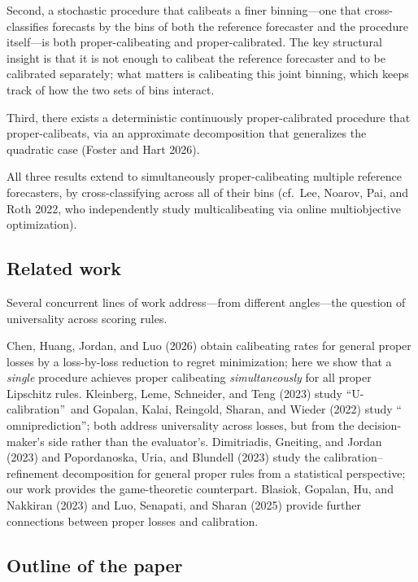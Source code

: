 \documentclass[12pt,a4paper,notitlepage]{article}
\begin{document}
Second, a stochastic procedure that calibeats a finer binning---one
that cross-classifies forecasts by the bins of both the reference
forecaster and the procedure itself---is both proper-calibeating and
proper-calibrated. The key structural insight is that it is not enough
to calibeat the reference forecaster and to be calibrated separately;
what matters is calibeating this joint binning, which keeps track of
how the two sets of bins interact.

Third, there exists a deterministic continuously proper-calibrated procedure
that proper-calibeats, via an approximate decomposition that generalizes the
quadratic case (Foster and Hart 2026).

All three results extend to simultaneously proper-calibeating multiple
reference forecasters, by cross-classifying across all of their bins
(cf.\ Lee, Noarov, Pai, and Roth 2022, who independently study
multicalibeating via online multiobjective optimization).

\subsection{Related work\label{s-s:intro-related}}

Several concurrent lines of work address---from different angles---the
question of universality across scoring rules.

Chen, Huang, Jordan, and Luo (2026) obtain calibeating rates for
general proper losses by a loss-by-loss reduction to regret minimization;
here we show that a \emph{single} procedure achieves proper calibeating
\emph{simultaneously} for all proper Lipschitz rules.
Kleinberg, Leme, Schneider, and Teng (2023) study
\textquotedblleft U-calibration\textquotedblright\ and Gopalan, Kalai,
Reingold, Sharan, and Wieder (2022) study \textquotedblleft
omniprediction\textquotedblright ; both address universality across losses,
but from the decision-maker's side rather than the evaluator's.
Dimitriadis, Gneiting, and Jordan (2023) and Popordanoska, Uria, and
Blundell (2023) study the calibration--refinement decomposition for general
proper rules from a statistical perspective; our work provides the
game-theoretic counterpart.
Blasiok, Gopalan, Hu, and Nakkiran (2023) and Luo, Senapati, and
Sharan (2025) provide further connections between proper losses
and calibration.

\subsection{Outline of the paper\label{s-s:intro-outline}}
\end{document}
